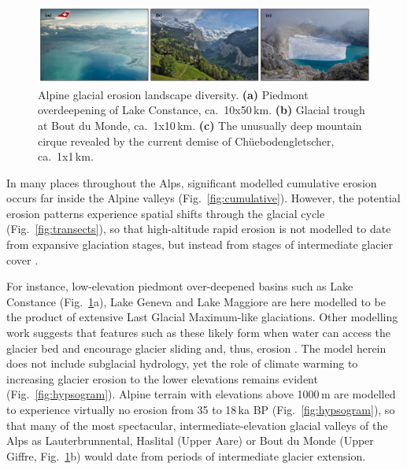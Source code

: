 \documentclass[esurf, manuscript]{copernicus}
\begin{document}
    \begin{figure}
      \centerline{\includegraphics{alpero_landscape}}
      \caption{%
        Alpine glacial erosion landscape diversity.
        \textbf{(a)} Piedmont overdeepening of Lake Constance, ca.~10x50\,km.
        \textbf{(b)} Glacial trough at Bout du Monde, ca.~1x10\,km.
        \textbf{(c)} The unusually deep mountain cirque revealed by the current
          demise of Ch\"uebodengletscher, ca.~1x1\,km.}
      \label{fig:landscape}
    \end{figure}

    In many places throughout the Alps, significant modelled cumulative erosion
    occurs far inside the Alpine valleys (Fig.~\ref{fig:cumulative}). However,
    the potential erosion patterns experience spatial shifts through the
    glacial cycle (Fig.~\ref{fig:transects}), so that high-altitude rapid
    erosion is not modelled to date from expansive glaciation stages, but
    instead from stages of intermediate glacier cover
    \citep[Fig.~\ref{fig:hypsogram};][]{Barr.etal.2019}.

    For instance, low-elevation piedmont over-deepened basins such as Lake
    Constance (Fig.~\ref{fig:landscape}a), Lake Geneva and Lake Maggiore are
    here modelled to be the product of extensive Last Glacial Maximum-like
    glaciations. Other modelling work suggests that features such as these
    likely form when water can access the glacier bed and encourage glacier
    sliding and, thus, erosion \citep{Herman.etal.2011}. The model herein does
    not include subglacial hydrology, yet the role of climate warming to
    increasing glacier erosion to the lower elevations remains evident
    (Fig.~\ref{fig:hypsogram}).
    Alpine terrain with elevations above 1000\,m are modelled to
    experience virtually no erosion from 35 to 18\,ka BP
    (Fig.~\ref{fig:hypsogram}), so that many of the most spectacular,
    intermediate-elevation glacial valleys of the Alps as Lauterbrunnental,
    Haslital (Upper Aare) or Bout du Monde (Upper Giffre,
    Fig.~\ref{fig:landscape}b)
    would date from periods of intermediate glacier extension.
\end{document}
